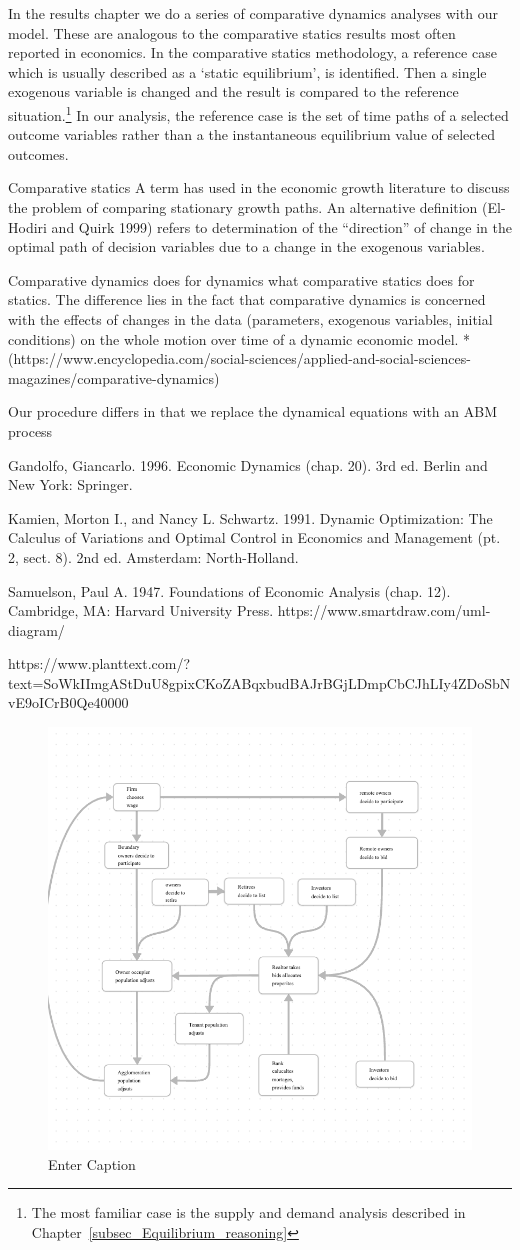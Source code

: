 
In the results chapter we do a series of comparative dynamics analyses with our model. These are analogous to the comparative statics results most often reported in economics. In the comparative statics methodology, a reference case which is usually described as a `static equilibrium', is identified. Then a single exogenous variable is changed and the result is compared to the reference situation.\footnote{The most familiar case is the supply and demand analysis described in Chapter~\ref{subsec_Equilibrium_reasoning}}  In our analysis, the reference case is the set of time paths of a selected outcome variables rather than a the  instantaneous equilibrium value of selected outcomes.  

Comparative statics
 A term has used in the economic growth literature to discuss the problem of comparing stationary growth paths.  An alternative definition (El-Hodiri and Quirk 1999) refers to determination of the ``direction'' of change in the optimal path of decision variables due to a change in the exogenous variables. 

Comparative dynamics does for dynamics what comparative statics does for statics. The difference lies in the fact that comparative dynamics is concerned with the effects of changes in the data (parameters, exogenous variables, initial conditions) on the whole motion over time of a dynamic economic model. *(https://www.encyclopedia.com/social-sciences/applied-and-social-sciences-magazines/comparative-dynamics)

Our procedure differs in that we replace the dynamical equations with an ABM process

Gandolfo, Giancarlo. 1996. Economic Dynamics (chap. 20). 3rd ed. Berlin and New York: Springer.

Kamien, Morton I., and Nancy L. Schwartz. 1991. Dynamic Optimization: The Calculus of Variations and Optimal Control in Economics and Management (pt. 2, sect. 8). 2nd ed. Amsterdam: North-Holland.

Samuelson, Paul A. 1947. Foundations of Economic Analysis (chap. 12). Cambridge, MA: Harvard University Press.
https://www.smartdraw.com/uml-diagram/

https://www.planttext.com/?text=SoWkIImgAStDuU8gpixCKoZABqxbudBAJrBGjLDmpCbCJhLIy4ZDoSbNvE9oICrB0Qe40000
\begin{figure}
    \centering
    \includegraphics[width=0.5\linewidth]{informationflows.png}
    \caption{Enter Caption}
    \label{fig:enter-label}
\end{figure}

